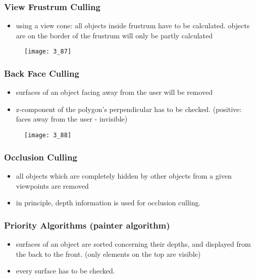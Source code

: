 \documentclass{standalone}
\begin{document}
\subsubsection{View Frustrum Culling}

\begin{itemize}
	\item using a view cone: all objects inside frustrum have to be calculated. objects are on the border of the frustrum will only be partly calculated
\end{itemize}

\begin{figure}[H]
	\texttt{[image: 3\_87]}
\end{figure}


\subsubsection{Back Face Culling}

\begin{itemize}
	\item surfaces of an object facing away from the user will be removed
	\item z-component of the polygon's perpendicular has to be checked. (positive: faces away from the user - invisible)
\end{itemize}

\begin{figure}[H]
	\texttt{[image: 3\_88]}
\end{figure}


\subsubsection{Occlusion Culling}

\begin{itemize}
	\item all objects which are completely hidden by other objects from a given viewpoints are removed
	\item in principle, depth information is used for occlusion culling.
\end{itemize}

\subsubsection*{Priority Algorithms (painter algorithm)}

\begin{itemize}
	\item surfaces of an object are sorted concerning their depths, and displayed from the back to the front. (only elements on the top are visible)
	\item every surface has to be checked. 
\end{itemize}
\end{document}
